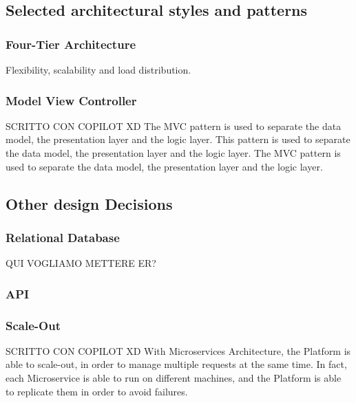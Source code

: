 \subsection{Selected architectural styles and patterns}
\subsubsection{Four-Tier Architecture}
Flexibility, scalability and load distribution.
\subsubsection{Model View Controller}
SCRITTO CON COPILOT XD
The MVC pattern is used to separate the data model, the presentation layer and the logic layer. This pattern is used to separate the data model, the presentation layer and the logic layer. The MVC pattern is used to separate the data model, the presentation layer and the logic layer.
\subsection{Other design Decisions}
\subsubsection{Relational Database}
QUI VOGLIAMO METTERE ER?
\subsubsection{API}
\subsubsection{Scale-Out}
SCRITTO CON COPILOT XD
With Microservices Architecture, the Platform is able to scale-out, in order to manage multiple requests at the same time. In fact, each Microservice is able to run on different machines, and the Platform is able to replicate them in order to avoid failures.